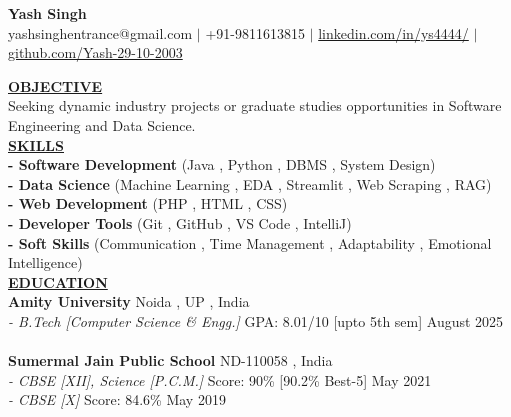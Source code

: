 \documentclass{article}
\begin{document}
\begin{center}
\thispagestyle{empty}
\large \textbf{Yash Singh \\}
\normalsize yashsinghentrance@gmail.com $\mid$ +91-9811613815 $\mid$ \href{https://www.linkedin.com/in/ys4444/}{linkedin.com/in/ys4444/} $\mid$ \href{https://github.com/Yash-29-10-2003}{github.com/Yash-29-10-2003} \\
\hrulefill
\end{center}


\noindent \textbf{\underline{OBJECTIVE}} \\
\noindent Seeking dynamic industry projects or graduate studies opportunities in Software Engineering and Data Science. \\


\noindent \textbf{\underline{SKILLS}} \\
\textbf{- Software Development} (Java , Python , DBMS , System Design) \\ \textbf{- Data Science} (Machine Learning , EDA , Streamlit , Web Scraping , RAG) \\ \textbf{- Web Development} (PHP , HTML , CSS) \\ \textbf{- Developer Tools} (Git , GitHub , VS Code , IntelliJ) \\ \textbf{- Soft Skills} (Communication , Time Management , Adaptability , Emotional Intelligence) \\

\noindent \textbf{\underline{EDUCATION}} \\
\textbf{Amity University} \hfill Noida , UP , India \\
\textit{- B.Tech [Computer Science \& Engg.]} \hfill \hspace{-0.3cm} GPA: 8.01/10 [upto 5th sem] \hfill August 2025 \\ \\
\textbf{Sumermal Jain Public School} \hfill  ND-110058 , India\\
\textit{- CBSE [XII], Science [P.C.M.]} \hfill Score: 90\% [90.2\% Best-5] \hfill May 2021 \\
\textit{- CBSE [X]} \hfill \hspace{0.95cm} Score: 84.6\%  \hfill May 2019 \\
\end{document}
